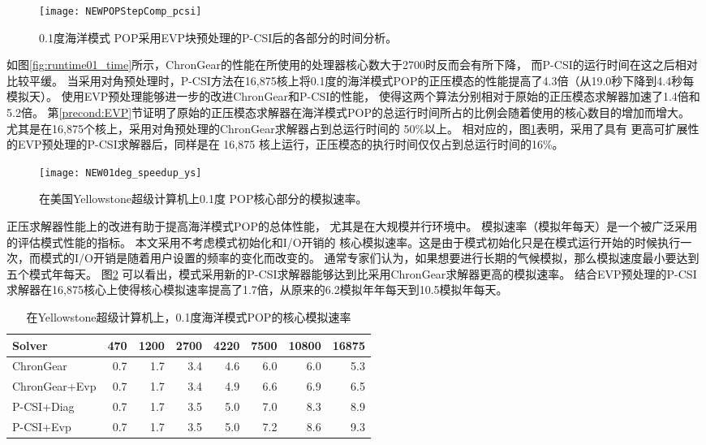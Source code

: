 \begin {figure}[!t]
\centering
\texttt{[image: NEWPOPStepComp\_pcsi]}
\caption[] { 0.1度海洋模式 POP采用EVP块预处理的P-CSI后的各部分的时间分析。 \label{fig:StepComp_pcsi}}
\end{figure}

如图\ref{fig:runtime01_time}所示，ChronGear的性能在所使用的处理器核心数大于2700时反而会有所下降，
而P-CSI的运行时间在这之后相对比较平缓。 
当采用对角预处理时，P-CSI方法在16,875核上将0.1度的海洋模式POP的正压模态的性能提高了4.3倍（从19.0秒下降到4.4秒每模拟天）。 
使用EVP预处理能够进一步的改进ChronGear和P-CSI的性能， 使得这两个算法分别相对于原始的正压模态求解器加速了1.4倍和5.2倍。
第\ref{precond:EVP}节证明了原始的正压模态求解器在海洋模式POP的总运行时间所占的比例会随着使用的核心数目的增加而增大。
尤其是在16,875个核上，采用对角预处理的ChronGear求解器占到总运行时间的 50\%以上。 
相对应的，图\ref{fig:StepComp_pcsi}表明，采用了具有 更高可扩展性的EVP预处理的P-CSI求解器后，同样是在 16,875 核上运行，正压模态的执行时间仅仅占到总运行时间的16\%。 

 
\begin {figure}[!t]
\centering
\texttt{[image: NEW01deg\_speedup\_ys]}
\caption []{在美国Yellowstone超级计算机上0.1度 POP核心部分的模拟速率。\label {fig:runtime01_rate}}
\end {figure}
正压求解器性能上的改进有助于提高海洋模式POP的总体性能， 尤其是在大规模并行环境中。
模拟速率（模拟年每天）是一个被广泛采用的评估模式性能的指标。
本文采用不考虑模式初始化和I/O开销的 核心模拟速率。这是由于模式初始化只是在模式运行开始的时候执行一次，而模式的I/O开销是随着用户设置的频率的变化而改变的。 
通常专家们认为，如果想要进行长期的气候模拟，那么模拟速度最小要达到五个模式年每天\cite{dennis2012computational}。
图\ref{fig:runtime01_rate} 可以看出，模式采用新的P-CSI求解器能够达到比采用ChronGear求解器更高的模拟速率。 
结合EVP预处理的P-CSI求解器在16,875核心上使得核心模拟速率提高了1.7倍，从原来的6.2模拟年年每天到10.5模拟年每天。 
 
\begin{table}
\begin{center}
\caption {在Yellowstone超级计算机上，0.1度海洋模式POP的核心模拟速率\label{tab:improve_01}}
\begin{tabular}{|l||r|r|r|r|r|r|r|}
\hline
Solver & 470  & 1200   & 2700 & 4220 & 7500 & 10800 & 16875\\\hline
\hline
ChronGear     &0.7 &1.7&3.4  &4.6 &6.0 &6.0 &5.3\\\hline
ChronGear+Evp &0.7 &1.7&3.4  &4.9 &6.6 &6.9 &6.5\\\hline
P-CSI+Diag    &0.7 &1.7&3.5  &5.0 &7.0 &8.3 &8.9\\\hline
P-CSI+Evp     &0.7 &1.7&3.5  &5.0 &7.2 &8.6 &9.3\\
\hline
\end{tabular}
\end{center}
\end{table}

